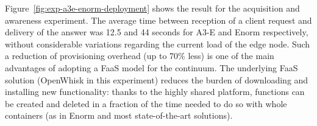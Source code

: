 Figure~\ref{fig:exp-a3e-enorm-deployment} shows the result for the acquisition and awareness experiment. The average time between reception of a client request and delivery of the answer was 12.5 and 44 seconds for A3-E and Enorm respectively, without considerable variations regarding the current load of the edge node. Such a reduction of provisioning overhead (up to 70\% less) is one of the main advantages of adopting a FaaS model for the continuum. The underlying FaaS solution (OpenWhisk in this experiment) reduces the burden of downloading and installing new functionality: thanks to the highly shared platform, functions can be created and deleted in a fraction of the time needed to do so with whole containers (as in Enorm and most state-of-the-art solutions). 

